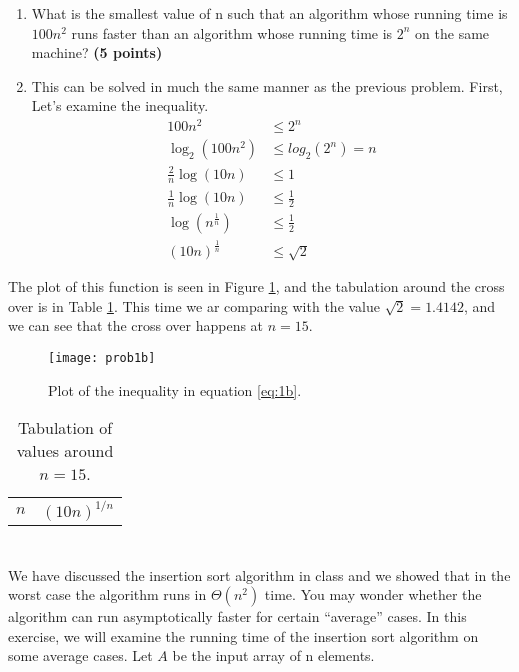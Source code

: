 \documentclass{article}
\begin{document}
\begin{enumerate}[label=(\alph*)]
\item  What is the smallest value of n such that an algorithm whose
running time is $100n^2$ runs faster than an algorithm whose running
time is $2^n$ on the same machine? {\bf (5 points) }
\item[] This can be solved in much the same manner as the previous
  problem. First, Let's examine the inequality.
  \begin{equation}\label{eq:1b}
    \begin{split}
      100 n^2 & \le 2^n\\
      \log_2(100n^2) & \le log_2(2^n) = n\\
      \frac{2}{n} \log(10n) &\le 1\\
      \frac{1}{n} \log(10n) &\le \frac1 2\\
      \log\left(n^{\frac{1}{n}}\right) &\le \frac{1}{2}\\
      \left(10n\right)^{\frac{1}{n}} &\le \sqrt{2}
    \end{split}
  \end{equation}
\end{enumerate} 

The plot of this function is seen in Figure \ref{fig:1b}, and the
tabulation around the cross over is in Table \ref{tab:1b}.  This time
we ar comparing with the value $\sqrt{2} = 1.4142$, and we can see
that the cross over happens at $n=15$.
\begin{figure}[h!t]
  \centering
  \texttt{[image: prob1b]}
  \caption{Plot of the inequality in equation \ref{eq:1b}.}
  \label{fig:1b}
\end{figure}

\begin{table}[h!t]
  \centering
  \caption{Tabulation of values around $n=15$.}
  \label{tab:1b}
  \begin{tabular}[h]{cc}
    $n$ & $(10n)^{1/n}$ \\
    
  \end{tabular}
\end{table}

\vspace{3em}
\section{}
We have discussed the insertion sort algorithm in class and we showed
that in the worst case the algorithm runs in $\Theta(n^2)$ time. You
may wonder whether the algorithm can run asymptotically faster for
certain ``average'' cases. In this exercise, we will examine the running
time of the insertion sort algorithm on some average cases. Let $A$ be 
the input array of n elements.
\end{document}
